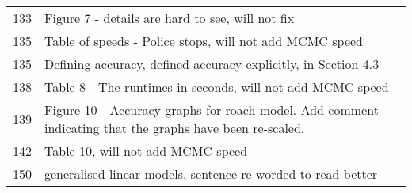 \documentclass{amsart}
\begin{document}
\begin{tabular}{cl}
 133  &  Figure 7 - details are hard to see, will not fix\\
 135  &  Table of speeds - Police stops, will not add MCMC speed\\
 135  &  Defining accuracy, defined accuracy explicitly, in Section 4.3\\
 138  &  Table 8 - The runtimes in seconds, will not add MCMC speed\\
 139  &  Figure 10 - Accuracy graphs for roach model. Add comment indicating that the graphs have been re-scaled.\\
 142  &  Table 10, will not add MCMC speed\\
 150  &  generalised linear models, sentence re-worded to read better
\end{tabular}
\end{document}
